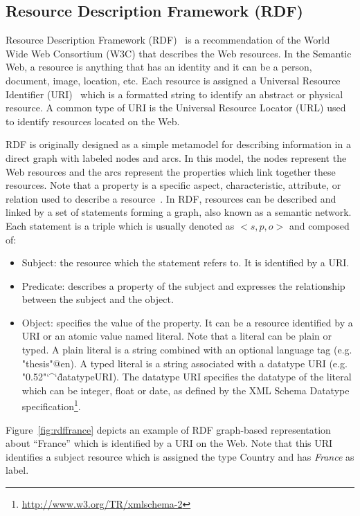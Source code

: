 \subsection{Resource Description Framework (RDF)}
Resource Description Framework (RDF)~\cite{Lassila:1999} is a recommendation of the World Wide Web Consortium (W3C) that describes the Web resources. In the Semantic Web, a resource is anything that has an identity and it can be a person, document, image, location, etc. Each resource is assigned a Universal Resource Identifier (URI)~\cite{Berners:2005} which is a formatted string to identify an abstract or physical resource. A common type of URI is the Universal Resource Locator (URL) used to identify resources located on the Web.

RDF is originally designed as a simple metamodel for describing information in a direct graph with labeled nodes and arcs. In this model, the nodes represent the Web resources and the arcs represent the properties which link together these resources. Note that a property is a specific aspect, characteristic, attribute, or relation used to 
describe a resource~\cite{Lassila:1999}. In RDF, resources can be described and linked by a set of statements forming a graph, also known as a semantic network. Each statement is a triple which is usually denoted as $<s,p,o>$ and composed of:
\begin{itemize}
\item Subject: the resource which the statement refers to. It is identified by a URI.
\item Predicate: describes a property of the subject and expresses the relationship between the subject and the object.
\item Object: specifies the value of the property. It can be a resource identified by a URI or an atomic value named literal. Note that a literal can be plain or typed. A plain literal
is a string combined with an optional language tag (e.g. "thesis"@en). A typed literal is a string associated with a datatype URI (e.g. "0.52"\char`\^\char`\^datatypeURI). The datatype URI
specifies the datatype of the literal which can be integer, float or date, as defined by the XML Schema Datatype specification\footnote{\url{http://www.w3.org/TR/xmlschema-2}}.
\end{itemize}

Figure~\ref{fig:rdffrance} depicts an example of RDF graph-based representation about ``France'' which is identified by a URI on the Web. Note that this URI identifies a subject resource which is assigned the type Country and has \emph{France} as label. 

